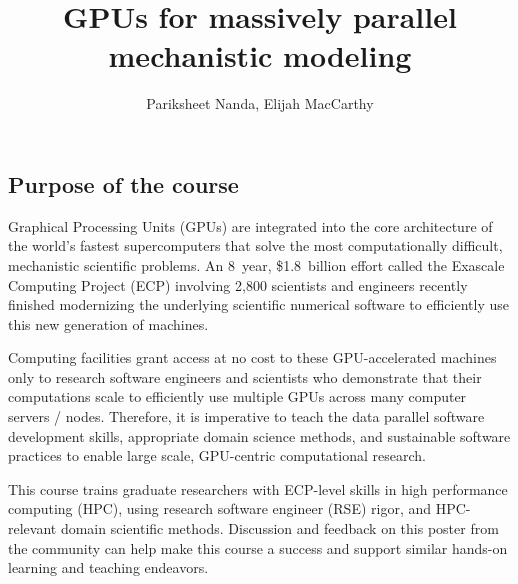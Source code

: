 \documentclass[
portrait,
custom
]{sciposter}
\title{GPUs for massively parallel mechanistic modeling}
\author{Pariksheet Nanda\textsuperscript{\footnotemark[2]}, %
  Elijah MacCarthy\textsuperscript{\footnotemark[3]}}
\institute{\textsuperscript{\footnotemark[2]}University of Pittsburgh, %
  \textsuperscript{\footnotemark[3]}Oak Ridge National Laboratory}
\begin{document}
\maketitle

\begin{multicols}{2}

  \section*{Purpose of the course}
  Graphical Processing Units (GPUs) %
  are integrated into the core architecture %
  of the world's fastest supercomputers %
  that solve the most computationally difficult, %
  mechanistic scientific problems.
  An 8~year, \$1.8~billion effort %
  called the Exascale Computing Project (ECP) %
  involving 2,800 scientists and engineers %
  recently finished modernizing %
  the underlying scientific numerical software %
  to efficiently use this new generation of machines.
  \medskip
  
  Computing facilities grant access at no cost %
  to these GPU-accelerated%
  \supercite{%
    carter_2014,%
    beckingsale_2019,%
    reinders_2023%
  } machines %
  only to research software engineers and scientists who demonstrate that %
  their computations scale %
  to efficiently use multiple GPUs across many computer servers / nodes.
  Therefore, %
  it is imperative to teach %
  the data parallel software development skills, %
  appropriate domain science methods, and %
  sustainable software practices %
  to enable large scale, GPU-centric computational research.
  \medskip
  
  This course trains graduate researchers %
  with ECP-level skills in high performance computing (HPC), %
  using research software engineer (RSE) rigor, %
  and HPC-relevant domain scientific methods.
  Discussion and feedback on this poster from the community %
  can help make this course a success and %
  support similar hands-on learning and teaching endeavors.


\end{multicols}
\end{document}
